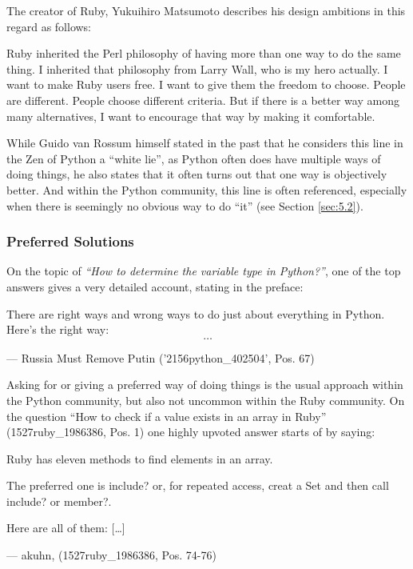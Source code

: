 The creator of Ruby, Yukuihiro Matsumoto describes his design ambitions in this regard as follows:

\begin{displayquote}
    Ruby inherited the Perl philosophy of having more than one way to do the same thing. I inherited that philosophy
    from Larry Wall, who is my hero actually. I want to make Ruby users free. I want to give them the freedom to choose.
    People are different. People choose different criteria. But if there is a better way among many alternatives, I want
    to encourage that way by making it comfortable. \cite{ruby_phil}
\end{displayquote}

While Guido van Rossum himself stated in the past that he considers this line in the Zen of Python a “white lie”,
as Python often does have multiple ways of doing things, he also states that it often turns out that one way is
objectively better. \cite{python_open_heart} And within the Python community, this line is often referenced, especially when there is seemingly
no obvious way to do “it” (see Section \ref{sec:5.2}).

\subsubsection{Preferred Solutions}

On the topic of \textit{“How to determine the variable type in Python?”}, one of the top answers gives a very
detailed account, stating in the preface:

\begin{displayquote}
    There are right ways and wrong ways to do just about everything in Python. Here's the right way:  \[\ldots\]

    --- Russia Must Remove Putin ('2156python\_402504', Pos. 67)

\end{displayquote}

Asking for or giving a preferred way of doing things is the usual approach within the Python community, but also not
uncommon within the Ruby community. On the question “How to check if a value exists in an array in Ruby” (1527ruby\_1986386, Pos. 1)
one highly upvoted answer starts of by saying:

\begin{displayquote}
    Ruby has eleven methods to find elements in an array.

    The preferred one is include? or, for repeated access, creat a Set and then call include? or member?.

    Here are all of them:  [\ldots]

    --- akuhn, (1527ruby\_1986386, Pos. 74-76)

\end{displayquote}

